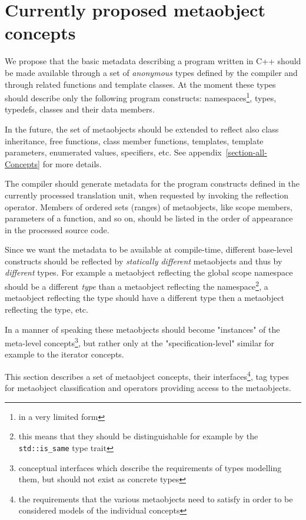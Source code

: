 \section{Currently proposed metaobject concepts}
\label{section-current-Concepts}

We propose that the basic metadata describing a program written
in C++ should be made available through a set of {\em anonymous} types
defined by the compiler and through related functions and template classes.
At the moment these types should describe only the following program
constructs: namespaces\footnote{in a very limited form}, types, typedefs,
classes and their data members.

In the future, the set of metaobjects should be extended to reflect also
class inheritance, free functions, class member functions, templates,
template parameters, enumerated values, specifiers, etc.
See appendix~\ref{section-all-Concepts} for more details.

The compiler should generate metadata for the program constructs defined
in the currently processed translation unit, when requested by invoking
the reflection operator. Members of ordered sets (ranges) of metaobjects,
like scope members, parameters of a function, and so on, should be listed
in the order of appearance in the processed source code.

Since we want the metadata to be available at compile-time,
different base-level constructs should be reflected by
{\em statically different} metaobjects and thus by {\em different} types.
For example a metaobject reflecting the global scope namespace should
be a different {\em type} than a metaobject reflecting the \verb@std@
namespace\footnote{this means that they should be distinguishable for
example by the \texttt{std::is\_same} type trait},
a metaobject reflecting the \verb@int@ type should
have a different type then a metaobject reflecting the \verb@double@
type, etc.

In a manner of speaking these metaobjects should become
"instances" of the meta-level concepts\footnote{conceptual interfaces which
describe the requirements of types modelling them, but
should not exist as concrete types}, but rather only at the
"specification-level" similar for example to the iterator concepts.

This section describes a set of metaobject concepts,
their interfaces\footnote{the requirements that the various metaobjects
need to satisfy in order to be considered models of the individual
concepts},
tag types for metaobject classification and operators providing access to the metaobjects.

